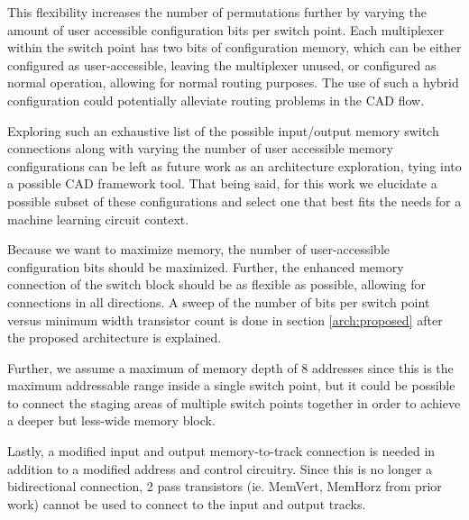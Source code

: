 This flexibility increases the number of permutations further by varying the amount of user accessible configuration bits per switch point. Each multiplexer within the switch point has two bits of configuration memory, which can be either configured as user-accessible, leaving the multiplexer unused, or configured as normal operation, allowing for normal routing purposes. The use of such a hybrid configuration could potentially alleviate routing problems in the CAD flow. 

Exploring such an exhaustive list of the possible input/output memory switch connections along with varying the number of user accessible memory configurations can be left as future work as an architecture exploration, tying into a possible CAD framework tool. That being said, for this work we elucidate a possible subset of these configurations and select one that best fits the needs for a machine learning circuit context. 

Because we want to maximize memory, the number of user-accessible configuration bits should be maximized. Further, the enhanced memory connection of the switch block should be as flexible as possible, allowing for connections in all directions. A sweep of the number of bits per switch point versus minimum width transistor count is done in section \ref{arch:proposed} after the proposed architecture is explained.

Further, we assume a maximum of memory depth of 8 addresses since this is the maximum addressable range inside a single switch point, but it could be possible to connect the staging areas of multiple switch points together in order to achieve a deeper but less-wide memory block. 

Lastly, a modified input and output memory-to-track connection is needed in addition to a modified address and control circuitry. Since this is no longer a bidirectional connection, 2 pass transistors (ie. MemVert, MemHorz from prior work) cannot be used to connect to the input and output tracks.



